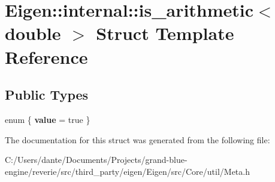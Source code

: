 \hypertarget{struct_eigen_1_1internal_1_1is__arithmetic_3_01double_01_4}{}\section{Eigen\+::internal\+::is\+\_\+arithmetic$<$ double $>$ Struct Template Reference}
\label{struct_eigen_1_1internal_1_1is__arithmetic_3_01double_01_4}
\subsection*{Public Types}
\begin{DoxyCompactItemize}
\item 
\mbox{\label{struct_eigen_1_1internal_1_1is__arithmetic_3_01double_01_4_a03593e746b86951b764a959102c8cbb8}} 
enum \{ {\bfseries value} = true
 \}
\end{DoxyCompactItemize}


The documentation for this struct was generated from the following file\+:\begin{DoxyCompactItemize}
\item 
C\+:/\+Users/dante/\+Documents/\+Projects/grand-\/blue-\/engine/reverie/src/third\+\_\+party/eigen/\+Eigen/src/\+Core/util/Meta.\+h\end{DoxyCompactItemize}
